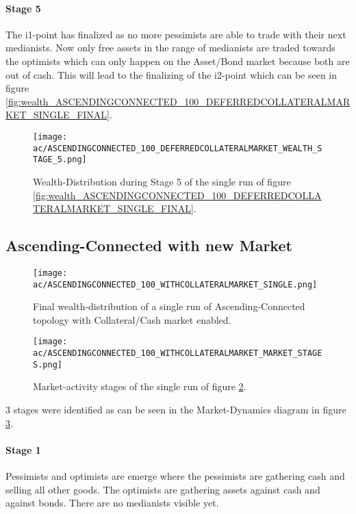 \documentclass[Bachelorarbeit.tex]{subfiles}
\begin{document}
\paragraph{Stage 5}
The i1-point has finalized as no more pessimists are able to trade with their next medianists. Now only free assets in the range of medianists are traded towards the optimists which can only happen on the Asset/Bond market because both are out of cash. This will lead to the finalizing of the i2-point which can be seen in figure \ref{fig:wealth_ASCENDINGCONNECTED_100_DEFERREDCOLLATERALMARKET_SINGLE_FINAL}.
 
\begin{figure}[H]
	\centering
  \texttt{[image: ac/ASCENDINGCONNECTED\_100\_DEFERREDCOLLATERALMARKET\_WEALTH\_STAGE\_5.png]}
  	\caption{Wealth-Distribution during Stage 5 of the single run of figure \ref{fig:wealth_ASCENDINGCONNECTED_100_DEFERREDCOLLATERALMARKET_SINGLE_FINAL}.}
  	\label{fig:markets_ASCENDINGCONNECTED_100_DEFERREDCOLLATERALMARKET_WEALTH_STAGE_5}
\end{figure}

\subsection{Ascending-Connected with new Market}

\begin{figure}[H]
	\centering
  \texttt{[image: ac/ASCENDINGCONNECTED\_100\_WITHCOLLATERALMARKET\_SINGLE.png]}
  	\caption{Final wealth-distribution of a single run of Ascending-Connected topology with Collateral/Cash market enabled.}
	\label{fig:wealth_ASCENDINGCONNECTED_100_WITHCOLLATERALMARKET_SINGLE}
\end{figure}

\begin{figure}[H]
	\centering
  \texttt{[image: ac/ASCENDINGCONNECTED\_100\_WITHCOLLATERALMARKET\_MARKET\_STAGES.png]}
  	\caption{Market-activity stages of the single run of figure \ref{fig:wealth_ASCENDINGCONNECTED_100_WITHCOLLATERALMARKET_SINGLE}.}
	\label{fig:markets_ASCENDINGCONNECTED_100_WITHCOLLATERALMARKET_MARKET_STAGES}
\end{figure}

3 stages were identified as can be seen in the Market-Dynamics diagram in figure \ref{fig:markets_ASCENDINGCONNECTED_100_WITHCOLLATERALMARKET_MARKET_STAGES}.

\paragraph{Stage 1}
Pessimists and optimists are emerge where the pessimists are gathering cash and selling all other goods. The optimists are gathering assets against cash and against bonds. There are no medianists visible yet.
\end{document}
